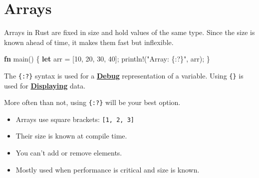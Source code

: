 \documentclass[
  letterpaper,
  DIV=11,
  numbers=noendperiod,
  oneside]{scrreprt}
\newenvironment{Shaded}{\begin{snugshade}}{\end{snugshade}}
\newcommand{\DecValTok}[1]{\textcolor[rgb]{0.68,0.00,0.00}{#1}}
\newcommand{\KeywordTok}[1]{\textcolor[rgb]{0.00,0.23,0.31}{\textbf{#1}}}
\newcommand{\NormalTok}[1]{\textcolor[rgb]{0.00,0.23,0.31}{#1}}
\newcommand{\OperatorTok}[1]{\textcolor[rgb]{0.37,0.37,0.37}{#1}}
\newcommand{\PreprocessorTok}[1]{\textcolor[rgb]{0.68,0.00,0.00}{#1}}
\newcommand{\StringTok}[1]{\textcolor[rgb]{0.13,0.47,0.30}{#1}}
\providecommand{\tightlist}{%
  \setlength{\itemsep}{0pt}\setlength{\parskip}{0pt}}\usepackage{longtable,booktabs,array}
\begin{document}
\section{Arrays}\label{arrays}

Arrays in Rust are fixed in size and hold values of the same type. Since
the size is known ahead of time, it makes them fast but inflexible.

\begin{Shaded}
\begin{Highlighting}[]
\KeywordTok{fn}\NormalTok{ main() }\OperatorTok{\{}
    \KeywordTok{let}\NormalTok{ arr }\OperatorTok{=}\NormalTok{ [}\DecValTok{10}\OperatorTok{,} \DecValTok{20}\OperatorTok{,} \DecValTok{30}\OperatorTok{,} \DecValTok{40}\NormalTok{]}\OperatorTok{;}
    \PreprocessorTok{println!}\NormalTok{(}\StringTok{"Array: \{:?\}"}\OperatorTok{,}\NormalTok{ arr)}\OperatorTok{;}
\OperatorTok{\}}
\end{Highlighting}
\end{Shaded}

\begin{tcolorbox}[enhanced jigsaw, titlerule=0mm, coltitle=black, opacitybacktitle=0.6, bottomrule=.15mm, bottomtitle=1mm, colframe=quarto-callout-note-color-frame, toprule=.15mm, opacityback=0, rightrule=.15mm, leftrule=.75mm, breakable, left=2mm, colback=white, colbacktitle=quarto-callout-note-color!10!white, toptitle=1mm, title=\textcolor{quarto-callout-note-color}{\faInfo}\hspace{0.5em}{Note}, arc=.35mm]

The \texttt{\{:?\}} syntax is used for a
\href{https://doc.rust-lang.org/std/fmt/trait.Debug.html}{\textbf{Debug}}
representation of a variable. Using \texttt{\{\}} is used for
\href{https://doc.rust-lang.org/std/fmt/trait.Display.html}{\textbf{Displaying}}
data.

More often than not, using \texttt{\{:?\}} will be your best option.

\end{tcolorbox}

\begin{itemize}
\tightlist
\item
  Arrays use square brackets: \texttt{{[}1,\ 2,\ 3{]}}
\item
  Their size is known at compile time.
\item
  You can't add or remove elements.
\item
  Mostly used when performance is critical and size is known.
\end{itemize}
\end{document}
